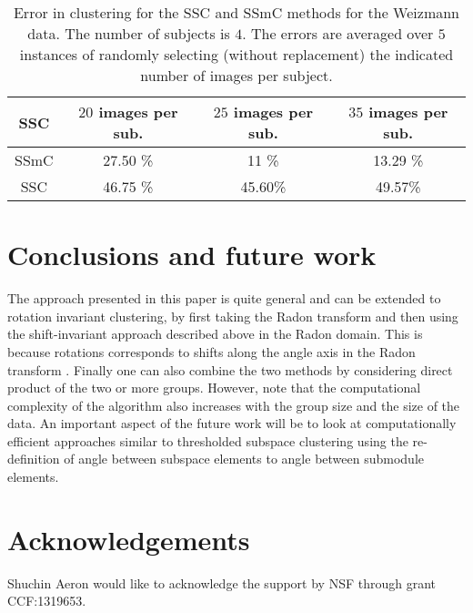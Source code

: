 \documentclass[conference]{IEEEtran}
\begin{document}
\begin{table*}
\begin{center}
\begin{tabular}{ |c|c| c|c| }
\hline
 SSC & $20$ images per sub. & $25$ images per sub. & $35$ images per sub. \\
 \hline 
 SSmC & 27.50 \% & 11 \%  & 13.29 \% \\  
 \hline
 SSC & 46.75 \% & 45.60\% & 49.57\% \\
 \hline
\end{tabular}
\vspace{2mm}
\caption{Error in clustering for the SSC and SSmC methods for the Weizmann data. The number of subjects is $4$. The errors are averaged over $5$ instances of randomly selecting (without replacement) the indicated number of images per subject.}
\label{tab:weizmann}
\end{center} 
\end{table*}

\section{Conclusions and future work}
\label{sec:conclude}

The approach presented in this paper is quite general and can be extended to rotation invariant clustering, by first taking the Radon transform and then using the shift-invariant approach described above in the Radon domain. This is because rotations corresponds to shifts along the angle axis in the Radon transform \cite{Chen:2012eo}. Finally one can also combine the two methods by considering direct product of the two or more groups. However, note that the computational complexity of the algorithm also increases with the group size and the size of the data. An important aspect of the future work will be to look at computationally efficient approaches similar to thresholded subspace clustering \cite{Heckel_ArXiv13} using the re-definition of angle between subspace elements to angle between submodule elements. 

\section{Acknowledgements}
Shuchin Aeron would like to acknowledge the support by NSF through grant CCF:1319653. 

%
\end{document}
